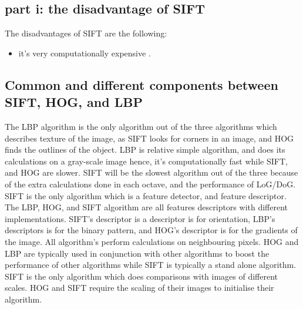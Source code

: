 \documentclass[conference]{IEEEtran}
\begin{document}
\subsection{part i: the disadvantage of SIFT}
The disadvantages of SIFT are the following:
\begin{itemize}
	\item it's very computationally expensive \cite{b8}.
\end{itemize}
\subsection{Common  and different components between SIFT, HOG, and LBP}

The LBP algorithm is the only algorithm out of the three algorithms which describes texture of the image, as SIFT looks for corners in an image, and HOG finds the outlines of  the object. LBP is relative simple algorithm, and does its calculations on a gray-scale image hence, it's computationally fast while SIFT, and HOG are slower. SIFT will be the slowest algorithm out of the three because of the extra calculations done in each octave, and the performance of LoG/DoG. SIFT is the only algorithm which is a feature detector, and feature descriptor. The LBP, HOG, and SIFT algorithm are all features descriptors with different implementations. SIFT's descriptor is a descriptor is for orientation, LBP's descriptors is for the binary pattern, and HOG's descriptor is for the gradients of the image. All algorithm's perform calculations on neighbouring pixels. HOG and LBP are typically used in conjunction with other algorithms to boost the performance of other algorithms while SIFT is typically a stand alone algorithm. SIFT is the only algorithm which does comparisons with images of different scales. HOG and SIFT require the scaling of their images to initialise their algorithm.\par
\end{document}
